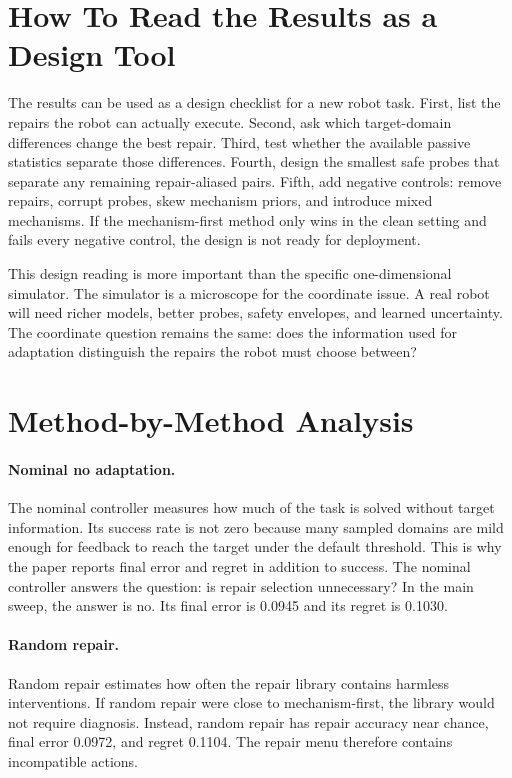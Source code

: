 \documentclass{article}
\begin{document}
\section{How To Read the Results as a Design Tool}

The results can be used as a design checklist for a new robot task. First, list
the repairs the robot can actually execute. Second, ask which target-domain
differences change the best repair. Third, test whether the available passive
statistics separate those differences. Fourth, design the smallest safe probes
that separate any remaining repair-aliased pairs. Fifth, add negative controls:
remove repairs, corrupt probes, skew mechanism priors, and introduce mixed
mechanisms. If the mechanism-first method only wins in the clean setting and
fails every negative control, the design is not ready for deployment.

This design reading is more important than the specific one-dimensional
simulator. The simulator is a microscope for the coordinate issue. A real robot
will need richer models, better probes, safety envelopes, and learned
uncertainty. The coordinate question remains the same: does the information used
for adaptation distinguish the repairs the robot must choose between?

\section{Method-by-Method Analysis}

\paragraph{Nominal no adaptation.}
The nominal controller measures how much of the task is solved without target
information. Its success rate is not zero because many sampled domains are mild
enough for feedback to reach the target under the default threshold. This is why
the paper reports final error and regret in addition to success. The nominal
controller answers the question: is repair selection unnecessary? In the main
sweep, the answer is no. Its final error is 0.0945 and its regret is 0.1030.

\paragraph{Random repair.}
Random repair estimates how often the repair library contains harmless
interventions. If random repair were close to mechanism-first, the library would
not require diagnosis. Instead, random repair has repair accuracy near chance,
final error 0.0972, and regret 0.1104. The repair menu therefore contains
incompatible actions.
\end{document}
